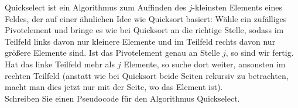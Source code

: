 
\begin{exercise}

Quickselect ist ein Algorithmus zum Auffinden des $j$-kleinsten Elements eines
Feldes, der auf einer ähnlichen Idee wie Quicksort basiert: Wähle ein zufälliges
Pivotelement und bringe es wie bei Quicksort an die richtige Stelle, sodass im
Teilfeld links davon nur kleinere Elemente und im Teilfeld rechts davon nur
größere Elemente sind. Ist das Pivotelement genau an
Stelle $j$, so sind wir fertig. Hat das linke Teilfeld mehr als $j$ Elemente,
so suche dort weiter, ansonsten im rechten Teilfeld (anstatt wie bei Quicksort beide
Seiten rekursiv zu betrachten, macht man dies jetzt nur mit der Seite, wo das Element ist). \\
Schreiben Sie einen Pseudocode für den Algorithmus Quickselect.

\end{exercise}



\begin{solution}

\phantom{}

\end{solution}
